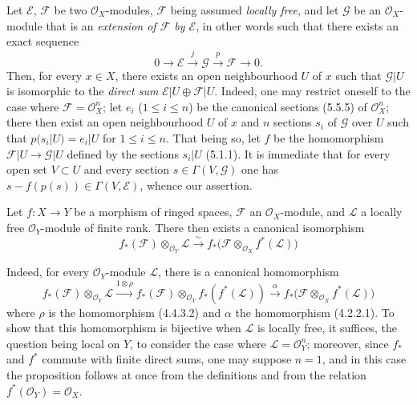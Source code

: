 \begin{env}[5.4.9]
\label{0.5.4.9}
Let $\mathcal{E}$, $\mathcal{F}$ be two $\mathcal{O}_X$-modules,
$\mathcal{F}$ being assumed \emph{locally free}, and let $\mathcal{G}$ be an
$\mathcal{O}_X$-module that is an \emph{extension of $\mathcal{F}$ by $\mathcal{E}$},
in other words such that there exists an exact sequence
\[
  0\longrightarrow\mathcal{E}\xrightarrow{j}\mathcal{G}
  \xrightarrow{p}\mathcal{F}\longrightarrow 0.
\]
Then, for every $x\in X$, there exists an open neighbourhood $U$ of $x$ such that
$\mathcal{G}|U$ is isomorphic to the \emph{direct sum}
$\mathcal{E}|U\oplus\mathcal{F}|U$. Indeed, one may restrict oneself to the case where
$\mathcal{F}=\mathcal{O}_X^n$; let $e_i$ ($1\leq i\leq n$) be the canonical
sections (5.5.5) of $\mathcal{O}_X^n$; there then exist an open neighbourhood
$U$ of $x$ and $n$ sections $s_i$ of $\mathcal{G}$ over $U$ such that
$p(s_i|U)=e_i|U$ for $1\leq i\leq n$. That being so, let $f$ be
the homomorphism $\mathcal{F}|U\to\mathcal{G}|U$ defined by the sections
$s_i|U$ (5.1.1). It is immediate that for every open set $V\subset U$ and every
section $s\in\Gamma(V,\mathcal{G})$ one has
$s-f(p(s))\in\Gamma(V,\mathcal{E})$, whence our assertion.
\end{env}

\begin{env}[5.4.10]
\label{0.5.4.10}
Let $f:X\to Y$ be a morphism of ringed spaces, $\mathcal{F}$ an
$\mathcal{O}_X$-module, and $\mathcal{L}$ a locally free
$\mathcal{O}_Y$-module of finite rank. There then exists a canonical isomorphism
\[
  f_*(\mathcal{F})\otimes_{\mathcal{O}_Y}\mathcal{L}
  \xrightarrow{\sim}
  f_*\bigl(\mathcal{F}\otimes_{\mathcal{O}_X}f^*(\mathcal{L})\bigr)
  \tag{5.4.10.1}\label{0.5.4.10.1}
\]


Indeed, for every $\mathcal{O}_Y$-module $\mathcal{L}$, there is a
canonical homomorphism
\[
  f_*(\mathcal{F})\otimes_{\mathcal{O}_Y}\mathcal{L}
  \xrightarrow{1\otimes\rho}
  f_*(\mathcal{F})\otimes_{\mathcal{O}_Y}f_*(f^*(\mathcal{L}))
  \xrightarrow{\alpha}
  f_*\bigl(\mathcal{F}\otimes_{\mathcal{O}_X}f^*(\mathcal{L})\bigr)
\]
where $\rho$ is the homomorphism (4.4.3.2) and $\alpha$ the homomorphism (4.2.2.1).
To show that this homomorphism is bijective when $\mathcal{L}$ is locally free,
it suffices, the question being local on $Y$, to consider the
case where $\mathcal{L}=\mathcal{O}_Y^n$; moreover, since $f_*$ and $f^*$ commute with
finite direct sums, one may suppose $n=1$, and in this case the proposition
follows at once from the definitions and from the relation
$f^*(\mathcal{O}_Y)=\mathcal{O}_X$.
\end{env}


